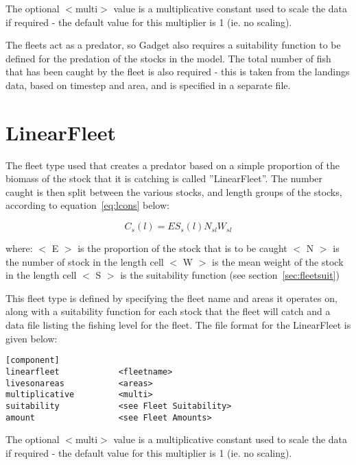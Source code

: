 \documentclass[10pt,twoside]{book}
\begin{document}
The optional $<$multi$>$ value is a multiplicative constant used to scale the data if required - the default value for this multiplier is 1 (ie. no scaling).

\bigskip
The fleets act as a predator, so Gadget also requires a suitability function to be defined for the predation of the stocks in the model.  The total number of fish that has been caught by the fleet is also required - this is taken from the landings data, based on timestep and area, and is specified in a separate file.

\section{LinearFleet}\label{sec:linearfleet}
The fleet type used that creates a predator based on a simple proportion of the biomass of the stock that it is catching is called ''LinearFleet''.  The number caught is then split between the various stocks, and length groups of the stocks, according to equation~\ref{eq:lcons} below:

\begin{equation}\label{eq:lcons}
C_{s}(l) = E S_{s}(l) N_{sl} W_{sl}
\end{equation}

where:\newline
$<$ E $>$ is the proportion of the stock that is to be caught\newline
$<$ N $>$ is the number of stock in the length cell\newline
$<$ W $>$ is the mean weight of the stock in the length cell\newline
$<$ S $>$ is the suitability function (see section~\ref{sec:fleetsuit})

\bigskip
This fleet type is defined by specifying the fleet name and areas it operates on, along with a suitability function for each stock that the fleet will catch and a data file listing the fishing level for the fleet.  The file format for the LinearFleet is given below:

{\small\begin{verbatim}
[component]
linearfleet            <fleetname>
livesonareas           <areas>
multiplicative         <multi>
suitability            <see Fleet Suitability>
amount                 <see Fleet Amounts>
\end{verbatim}}

The optional $<$multi$>$ value is a multiplicative constant used to scale the data if required - the default value for this multiplier is 1 (ie. no scaling).
\end{document}
